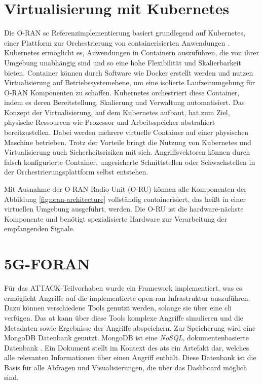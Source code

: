 \section{Virtualisierung mit Kubernetes}
Die O-RAN \gls{sc} Referenzimplementierung basiert grundlegend auf Kubernetes, einer Plattform zur Orchestrierung von containerisierten Anwendungen \autocite{ReleaseReleasesConfluence}. Kubernetes ermöglicht es, Anwendungen in Containern auszuführen, die von ihrer Umgebung unabhängig sind und so eine hohe Flexibilität und Skalierbarkeit bieten. Container können durch Software wie Docker erstellt werden und nutzen Virtualisierung auf Betriebssystemebene, um eine isolierte Laufzeitumgebung für O-RAN Komponenten zu schaffen. Kubernetes orchestriert diese Container, indem es deren Bereitstellung, Skalierung und Verwaltung automatisiert. Das Konzept der Virtualisierung, auf dem Kubernetes aufbaut, hat zum Ziel, physische Ressourcen wie Prozessor und Arbeitsspeicher abstrahiert bereitzustellen. Dabei werden mehrere virtuelle Container auf einer physischen Maschine betrieben. Trotz der Vorteile bringt die Nutzung von Kubernetes und Virtualisierung auch Sicherheitsrisiken mit sich. Angriffsvektoren können durch falsch konfigurierte Container, ungesicherte Schnittstellen oder Schwachstellen in der Orchestrierungsplattform selbst entstehen.
\par Mit Ausnahme der O-RAN Radio Unit (O-RU) können alle Komponenten der Abbildung \ref{fig:oran-architecture} vollständig containerisiert, das heißt in einer virtuellen Umgebung ausgeführt, werden. Die O-RU ist die hardware-nächste Komponente und benötigt spezialisierte Hardware zur Verarbeitung der empfangenden Signale.

\section{5G-FORAN}
\label{sec:tech-foran}
Für das ATTACK-Teilvorhaben wurde ein Framework implementiert, was es ermöglicht Angriffe auf die implementierte \gls{open-ran} Infrastruktur auszuführen. Dazu können verschiedene Tools genutzt werden, solange sie über eine \gls{cli} verfügen. Das \gls{at} kann über diese Tools komplexe Angriffe simulieren und die Metadaten sowie Ergebnisse der Angriffe abspeichern. Zur Speicherung wird eine MongoDB Datenbank genutzt. MongoDB ist eine \textit{NoSQL}, dokumentenbasierte Datenbank \autocite{MongoDBDeveloperData}. Ein Dokument stellt im Kontext des \glspl{at} ein Artefakt dar, welches alle relevanten Informationen über einen Angriff enthält. Diese Datenbank ist die Basis für alle Abfragen und Visualisierungen, die über das Dashboard möglich sind.

